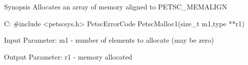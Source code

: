 Synopsis
Allocates an array of memory aligned to PETSC_MEMALIGN

C:
#include <petscsys.h>
PetscErrorCode PetscMalloc1(size_t m1,type **r1)

Input Parameter:
m1 - number of elements to allocate (may be zero)

Output Parameter:
r1 - memory allocated
